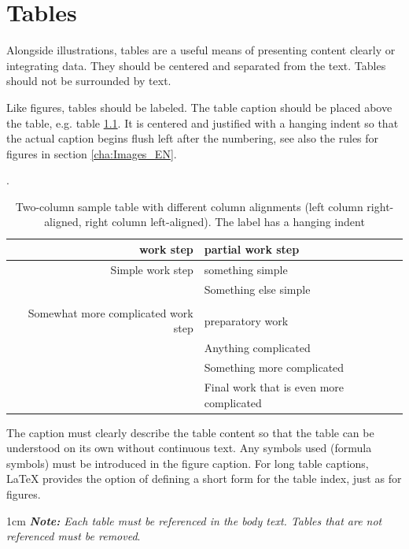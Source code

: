 \chapter{Tables}
\label{cha:Tables}

Alongside illustrations, tables are a useful means of presenting content clearly or integrating data. They should be centered and separated from the text. Tables should not be surrounded by text.

Like figures, tables should be labeled. The table caption should be placed above the table, e.g. table \ref{tab:Beispieltab-1_EN}. It is centered and justified with a hanging indent so that the actual caption begins flush left after the numbering, see also the rules for figures in section \ref{cha:Images_EN}. 

\begin{table}[!htbp]
	\centering
	\caption[Two-column sample table with different column alignments]{Two-column sample table with different column alignments (left column right-aligned, right column left-aligned). The label has a hanging indent}.
	\begin{tabular}{rl}
		\toprule
		\textbf{work step} & \textbf{partial work step} \\
		\midrule
		Simple work step & something simple \\
		& Something else simple \\
		&\\
		Somewhat more complicated work step & preparatory work \\
		& Anything complicated \\
		& Something more complicated \\
		& Final work that is even more complicated \\
		\bottomrule
	\end{tabular}%
	\label{tab:Beispieltab-1_EN}%
\end{table}%


The caption must clearly describe the table content so that the table can be understood on its own without continuous text. Any symbols used (formula symbols) must be introduced in the figure caption. For long table captions, \LaTeX{} provides the option of defining a short form for the table index, just as for figures.

\begin{addmargin}[1cm]{1cm}
	\textit{\textbf{Note:} Each table must be referenced in the body text. Tables that are not referenced must be removed}.
\end{addmargin}

